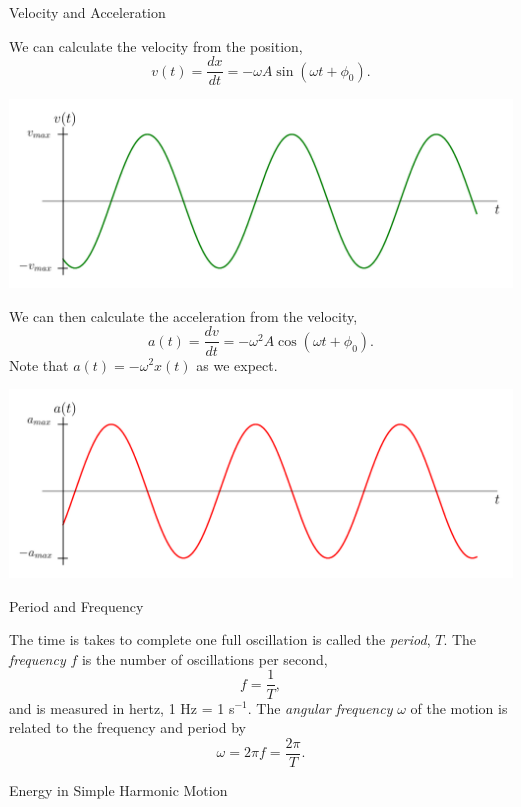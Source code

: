 \documentclass{summarysheet}
\begin{document}
\begin{multicols}{2}
\begin{topicbox}{Velocity and Acceleration}

\noindent We can calculate the velocity from the position,
\[
v(t) = \frac{dx}{dt} = -\omega A \sin (\omega t + \phi_0).
\]
\begin{center}
\includegraphics[scale=0.35]{fig_vel.pdf}
\end{center}
We can then calculate the acceleration from the velocity,
\[
a(t) = \frac{dv}{dt} = -\omega^2 A \cos(\omega t + \phi_0).
\]
Note that $a(t) = -\omega^2 x(t)$ as we expect.

\begin{center}
\includegraphics[scale=0.35]{fig_acc.pdf}
\end{center}


\end{topicbox}



\begin{topicbox}{Period and Frequency}

\noindent The time is takes to complete one full oscillation is called the \emph{period}, $T$.  The \emph{frequency} $f$ is the number of oscillations per second,
\[
f = \frac{1}{T},
\]
and is measured in hertz, 1 Hz = 1 s$^{-1}$.  The \emph{angular frequency} $\omega$ of the motion is related to the frequency and period by
\[
\omega = 2\pi f = \frac{2 \pi}{T}.
\]

\end{topicbox}


\begin{topicbox}{Energy in Simple Harmonic Motion}


\end{topicbox}
\end{multicols}
\end{document}
